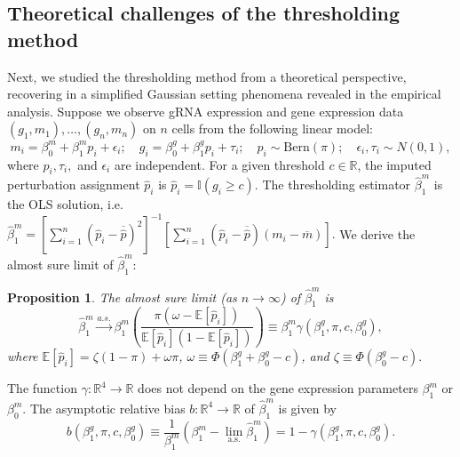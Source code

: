 \documentclass[12pt]{article}
\newtheorem{proposition}{Proposition}
\begin{document}
\subsection{Theoretical challenges of the thresholding method}\label{sec:thresholding_theory}

Next, we studied the thresholding method from a theoretical perspective, recovering in a simplified Gaussian setting phenomena revealed in the empirical analysis. Suppose we observe gRNA expression and gene expression data $(g_1, m_1), \dots, (g_n, m_n)$ on $n$ cells from the following linear model:
\begin{equation}\label{theoretical_model}
m_i = \beta^m_0 + \beta^m_1 p_i + \epsilon_i; \quad
g_i = \beta^g_0 + \beta^g_1 p_i + \tau_i; \quad
p_i \sim \textrm{Bern}(\pi); \quad
\epsilon_i, \tau_i \sim N(0,1),
\end{equation}
where $p_i, \tau_i,$ and $\epsilon_i$ are independent. For a given threshold $c \in \mathbb{R}$, the imputed perturbation assignment $\hat{p}_i$ is $\hat{p}_i = \mathbb{I}(g_i \geq c).$ The thresholding estimator $\hat{\beta}^m_1$ is the OLS solution, i.e. $\hat{\beta}^m_1 = \left[\sum_{i=1}^n (\hat{p}_i - \overline{\hat{p}})^2\right]^{-1}\left[\sum_{i=1}^n (\hat{p}_i - \overline{\hat{p}})(m_i - \overline{m})\right].$ We derive the almost sure limit of $\hat{\beta}^m_1$: 
\begin{proposition}\label{prop:convergence}
	The almost sure limit (as $n \to \infty$) of $\hat{\beta}^m_1$ is
	\begin{equation}\label{thresh_est_intercepts}
	\hat{\beta}^m_1 \xrightarrow{a.s.} \beta^m_1 \left(\frac{ \pi( \omega - \mathbb{E}[ \hat{p}_i ])}{ \mathbb{E}[\hat{p}_i] (1 - \mathbb{E}[\hat{p}_i])}\right) \equiv \beta^m_1 \gamma(\beta^g_1, \pi, c, \beta^g_0), 
	\end{equation} where 
	$
	\mathbb{E}[\hat{p}_i] = \zeta(1-\pi) + \omega\pi$, $\omega \equiv \Phi\left(\beta_1^g + \beta_0^g -c \right)$, and $\zeta \equiv \Phi\left( \beta^g_0 - c \right).$
\end{proposition}
The function $\gamma: \mathbb{R}^4 \to \mathbb{R}$ does not depend on the gene expression parameters $\beta^m_1$ or $\beta^m_0$. The asymptotic relative bias $b: \mathbb{R}^4 \to \mathbb{R}$ of $\hat{\beta}^m_1$ is given by
$$b(\beta^g_1, \pi, c, \beta^g_0)  \equiv \frac{1}{\beta^m_1} \left(\beta^m_1 - \lim_\textrm{a.s.} \hat{\beta}^m_1 \right) = 1 - \gamma(\beta^g_1, \pi, c, \beta^g_0).$$
\end{document}
